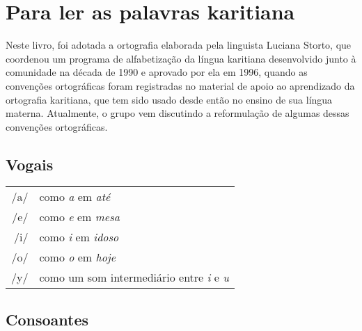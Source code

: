 \chapter{Para ler as palavras karitiana}

Neste livro, foi adotada a ortografia elaborada pela linguista Luciana
Storto, que coordenou um programa de alfabetização da língua karitiana
desenvolvido junto à comunidade na década de 1990 e aprovado por ela em
1996, quando as convenções ortográficas foram registradas no material de
apoio ao aprendizado da ortografia karitiana, que tem sido usado desde
então no ensino de sua língua materna. Atualmente, o grupo vem
discutindo a reformulação de algumas dessas convenções ortográficas.

\section{Vogais}

\begingroup
\begin{tabular}{rl}
/a/ & como \textit{a} em \textit{até}\\
/e/ & como \textit{e} em \textit{mesa}\\
/i/ & como \textit{i} em \textit{idoso}\\
/o/ & como \textit{o} em \textit{hoje}\\
/y/ & como um som intermediário entre \textit{i} e \textit{u}\protect\footnotemark\\
\end{tabular}


\endgroup

\section{Consoantes}

